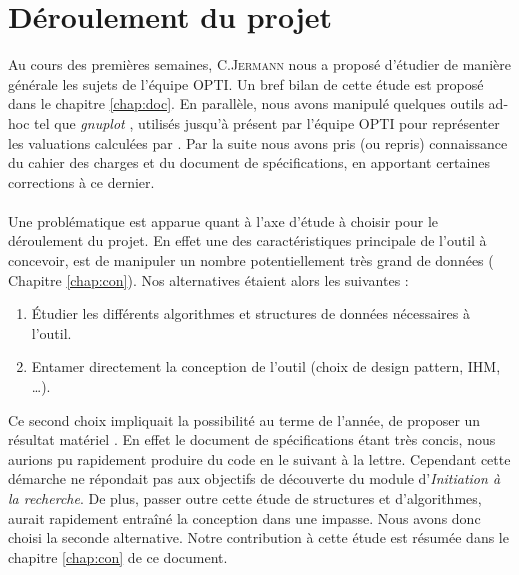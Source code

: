 \section{Déroulement du projet}
Au cours des premières semaines, C.\textsc{Jermann} nous a proposé d'étudier de manière générale les sujets de l'équipe \textsc{OPTI}. Un bref bilan de cette étude est proposé dans le chapitre \ref{chap:doc}. En parallèle, nous avons manipulé quelques outils ad-hoc tel que \emph{gnuplot} \cite{gnu}, utilisés jusqu'à présent par l'équipe \textsc{OPTI} pour représenter les valuations calculées par \realpaver. Par la suite nous avons pris (ou repris) connaissance du cahier des charges et du document de spécifications, en apportant certaines corrections à ce dernier. 

\paragraph{}Une problématique est apparue quant à l'axe d'étude à choisir pour le déroulement du projet. En effet une des caractéristiques principale de l'outil à concevoir, est de manipuler un nombre potentiellement très grand de données (\cf{} Chapitre \ref{chap:con}). Nos alternatives étaient alors les suivantes : 
\begin{enumerate}
\item
Étudier les différents algorithmes et structures de données nécessaires à l'outil.
\item
Entamer directement la conception de l'outil (choix de design pattern, IHM, \dots).
\end{enumerate} 
Ce second choix impliquait la possibilité au terme de l'année, de proposer un résultat \og matériel \fg{}. En effet le document de spécifications étant très concis, nous aurions pu rapidement produire du code en le suivant à la lettre. Cependant cette démarche ne répondait pas aux objectifs de découverte du module d'\emph{Initiation à la recherche}. De plus, passer outre cette étude de structures et d'algorithmes, aurait rapidement entraîné la conception dans une impasse. Nous avons donc choisi la seconde alternative. Notre contribution à cette étude est résumée dans le chapitre \ref{chap:con} de ce document.


